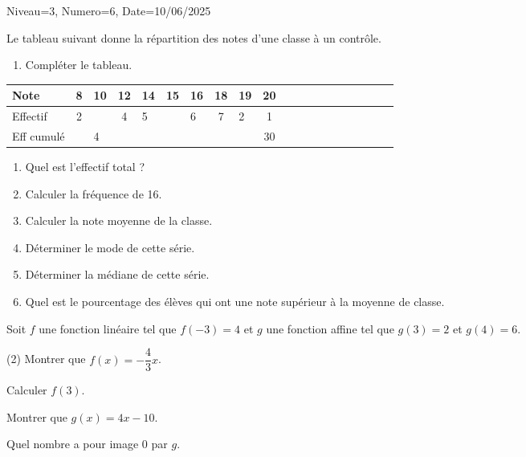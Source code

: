 \documentclass[12pt]{article}
\begin{document}
\begin{Maquette}[DS]{Niveau=3, Numero=6, Date=10/06/2025}


\begin{exercice}[BaremeDetaille=true]
\begin{minipage}{.42\linewidth}
Le tableau suivant donne la répartition des notes d'une classe à un contrôle.
\begin{enumerate}
\item{} Compléter le tableau.
 \end{enumerate}
 \end{minipage}%
 \begin{minipage}{.58\linewidth}
\begin{tabular}{|Oc|Oc|Oc|Oc|Oc|Oc|Oc|Oc|Oc|Oc|}
\hline 
Note & 8 & 10 & 12 & 14 & 15 & 16 & 18 & 19 & 20 \\ 
\hline 
Effectif & 2 &  & 4 & 5 &  & 6 & 7 & 2 & 1 \\ 
\hline 
Eff cumulé &  & 4 &  &  &  &  &  &  & 30 \\ 
\hline 
\end{tabular} 
\end{minipage}%
\begin{enumerate}[start=2]
\item{} Quel est l'effectif total ?
 \anserline[1]
\item{} Calculer la fréquence   de 16.\anserline[1]
\item{} Calculer la note moyenne de la classe.\anserline[2]
\item{} Déterminer le mode de cette série.\anserline[1]
\item{} Déterminer la médiane de cette série.\anserline[1]
\item{} Quel est le pourcentage des élèves qui ont une note supérieur à la moyenne de classe.\par\anserline[1]
\end{enumerate}
\end{exercice}

\begin{exercice}[BaremeDetaille=true]
Soit $f$ une fonction linéaire tel que $f(-3)=4$ et $g$ une fonction affine tel que $g(3)=2$ et $g(4)=6$.
\begin{tasks}[label=\arabic*.](2)
\task{} Montrer que $f(x)=-\dfrac{4}{3}x$.
\par\anserline[3]
\task{} Calculer $f(3)$.\par\anserline[3]
\task{}  Montrer que $g(x)=4x-10$.
\par\anserline[4]
\task{} Quel nombre a pour image 0 par $g$.\par\anserline[4]
\end{tasks}
\end{exercice}


\end{Maquette}
\end{document}
